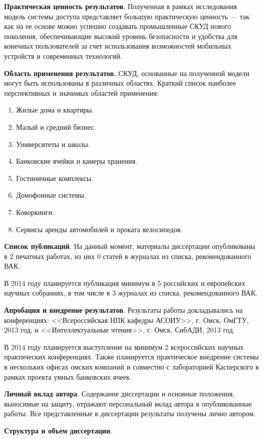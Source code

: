 \textbf{Практическая ценность результатов}. Полученная в рамках исследования модель системы доступа представляет большую практическую ценность — так как на ее основе можно успешно создавать промышленные СКУД нового поколения, обеспечивающие высокий уровень безопасности и удобства для конечных пользователей за счет использования возможностей мобильных устройств и современных технологий.

\medskip

\textbf{Область применения результатов.} СКУД, основанные на полученной модели могут быть использованы в различных областях. Краткий список наиболее перспективных и значимых областей применения:
\begin{enumerate}
  \item Жилые дома и квартиры.
  \item Малый и средний бизнес.
  \item Университеты и школы.
  \item Банковские ячейки и камеры хранения.
  \item Гостиничные комплексы.
  \item Домофонные системы.
  \item Коворкинги.
  \item Сервисы аренды автомобилей и проката велосипедов.
\end{enumerate}

\medskip

\textbf{Список публикаций}. На данный момент, материалы диссертации опубликованы в 2 печатных работах, из них 0 статей в журналах из списка, рекомендованного ВАК. 

В 2014 году планируется публикация минимум в 5 российских и европейских научных собраниях, в том числе в 3 журналах из списка, рекомендованного ВАК. 

\medskip

\textbf{Апробация и внедрение результатов}. Результаты работы докладывались на конференциях: <<Всероссийская НПК кафедры АСОИУ>>, г. Омск, ОмГТУ, 2013 год, и <<Интеллектуальные чтения>>, г. Омск, СибАДИ, 2013 год.

В 2014 году планируется выступление на минимум 2 всероссийских научных практических конференциях. Также планируется практическое внедрение системы в нескольких офисах омских компаний и совместно с лабораторией Касперского в рамках проекта умных банковских ячеек.

\medskip

\textbf{Личный вклад автора}. Содержание диссертации и основные поло­жения, выносимые на защиту, отражают персональный вклад автора в опубликованные работы. Все представленные в диссертации результаты по­лучены лично автором.

\medskip

\textbf{Структура и объем диссертации}.

\clearpage